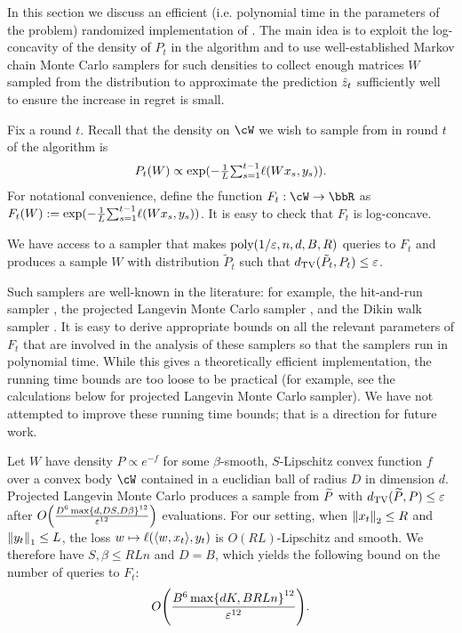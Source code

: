 
In this section we discuss an efficient (i.e. polynomial time in the parameters of the problem) randomized implementation of . The main idea is to exploit the log-concavity of the density of $P_t$ in the algorithm and to use well-established Markov chain Monte Carlo samplers for such densities to collect enough matrices $W$ sampled from the distribution to approximate the prediction $\zh_t$ sufficiently well to ensure the increase in regret is small.

Fix a round $t$. Recall that the density on $\cW$ we wish to sample from in round $t$ of the algorithm is 
\[
  P_{t}(W) \propto \exp\prn{-\tfrac{1}{L}\textstyle{\sum}_{s=1}^{t-1}\ls(Wx_s, y_s)}.
\]
For notational convenience, define the function $F_t: \cW \rightarrow \R$ as $F_t(W) := \exp\prn{-\tfrac{1}{L}\textstyle{\sum}_{s=1}^{t-1}\ls(Wx_s, y_s)}$. It is easy to check that $F_t$ is log-concave.
\begin{assumption}
\label{ass:sampler}
We have access to a sampler that makes $\text{poly}(1/\veps, n, d, B, R)$ queries to $F_t$ and produces a sample $W$ with distribution $\tilde{P}_t$ such that $d_{\textrm{TV}}(\tilde{P}_t, P_t)\leq{}\veps$.
\end{assumption}

Such samplers are well-known in the literature: for example, the hit-and-run sampler \citep{lovasz2006fast}, the projected Langevin Monte Carlo sampler \citep{bubeck2015sampling}, and the Dikin walk sampler \citep{narayanan2017efficient}. It is easy to derive appropriate bounds on all the relevant parameters of $F_t$ that are involved in the analysis of these samplers so that the samplers run in polynomial time. While this gives a theoretically efficient implementation, the running time bounds are too loose to be practical (for example, see the calculations below for projected Langevin Monte Carlo sampler). We have not attempted to improve these running time bounds; that is a direction for future work.

\begin{example}
Let $W$ have density $P\propto e^{-f}$ for some $\beta$-smooth, $S$-Lipschitz convex function $f$ over a convex body $\cW$ contained in a euclidian ball of radius $D$ in dimension $d$.
Projected Langevin Monte Carlo produces a sample from $\wt{P}$ with $d_{\textrm{TV}}(\wt{P}, P)\leq{}\veps$ after
$O\prn*{
\frac{D^{6}\max\crl*{d, DS, D\beta}^{12}}{\veps^{12}}
}
$
evaluations. For our setting, when $\nrm*{x_t}_{2}\leq{}R$ and $\nrm*{y_t}_{1}\leq{}L$, the loss $w\mapsto{}\ls(\tri*{w,x_t}, y_t)$ is $O(RL)$-Lipschitz and smooth. We therefore have $S,\beta\leq{}RLn$ and $D=B$, which yields the following bound on the number of queries to $F_t$:
\[
O\prn*{
\frac{B^{6}\max\crl*{dK, BRLn}^{12}}{\veps^{12}}
}.
\]

\end{example}

